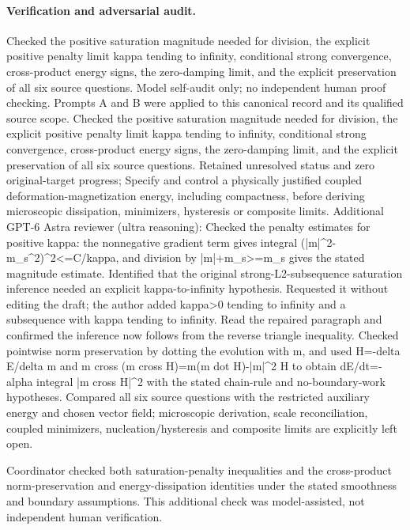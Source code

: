 \documentclass[11pt]{article}
\begin{document}
\paragraph{Verification and adversarial audit.}
Checked the positive saturation magnitude needed for division, the explicit positive penalty limit kappa tending to infinity, conditional strong convergence, cross-product energy signs, the zero-damping limit, and the explicit preservation of all six source questions. Model self-audit only; no independent human proof checking. Prompts A and B were applied to this canonical record and its qualified source scope. Checked the positive saturation magnitude needed for division, the explicit positive penalty limit kappa tending to infinity, conditional strong convergence, cross-product energy signs, the zero-damping limit, and the explicit preservation of all six source questions. Retained unresolved status and zero original-target progress; Specify and control a physically justified coupled deformation-magnetization energy, including compactness, before deriving microscopic dissipation, minimizers, hysteresis or composite limits. Additional GPT-6 Astra reviewer (ultra reasoning): Checked the penalty estimates for positive kappa: the nonnegative gradient term gives integral (|m|\textasciicircum{}2-m\_s\textasciicircum{}2)\textasciicircum{}2<=C/kappa, and division by |m|+m\_s>=m\_s gives the stated magnitude estimate. Identified that the original strong-L2-subsequence saturation inference needed an explicit kappa-to-infinity hypothesis. Requested it without editing the draft; the author added kappa>0 tending to infinity and a subsequence with kappa tending to infinity. Read the repaired paragraph and confirmed the inference now follows from the reverse triangle inequality. Checked pointwise norm preservation by dotting the evolution with m, and used H=-delta E/delta m and m cross (m cross H)=m(m dot H)-|m|\textasciicircum{}2 H to obtain dE/dt=-alpha integral |m cross H|\textasciicircum{}2 with the stated chain-rule and no-boundary-work hypotheses. Compared all six source questions with the restricted auxiliary energy and chosen vector field; microscopic derivation, scale reconciliation, coupled minimizers, nucleation/hysteresis and composite limits are explicitly left open.

Coordinator checked both saturation-penalty inequalities and the cross-product norm-preservation and energy-dissipation identities under the stated smoothness and boundary assumptions. This additional check was model-assisted, not independent human verification.
\end{document}
